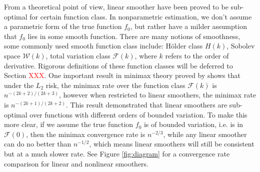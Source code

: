 \documentclass[a4paper]{article}
\renewcommand{\cal}{\mathcal}
\begin{document}
From a theoretical point of view, linear smoother have been proved to be sub-optimal for certain function class. In nonparametric estimation, we don't assume a parametric form of the true function $f_0$, but rather have a milder assumption that $f_0$ lies in some smooth function. There are many notions of smoothness, some commonly used smooth function class include: H\"older class $H(k)$, Sobolev space $\cal{W}(k)$, total variation class $\cal{F}(k)$, where $k$ refers to the order of derivative. Rigorous definitions of these function classes will be deferred to Section \textcolor{red}{XXX}. One important result in minimax theory proved by \cite{donoho1998minimax} shows that under the $L_2$ risk, the minimax rate over the function class $\cal{F}(k)$ is $n^{-(2k+2)/(2k+3)}$, however when restricted to linear smoothers, the minimax rate is $n^{-(2k+1)/(2k+2)}$. This result demonstrated that linear smoothers are sub-optimal over functions with different orders of bounded variation. To make this more clear, if we assume the true function $f_0$ is of bounded variation, i.e. is in $\cal{F}(0)$, then the minimax convergence rate is $n^{-2/3}$, while any linear smoother can do no better than $n^{-1/2}$, which means linear smoothers will still be consistent but at a much slower rate. See Figure \ref{fig:diagram} for a convergence rate comparison for linear and nonlinear smoothers.
\end{document}
